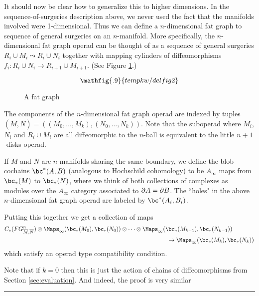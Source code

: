 It should now be clear how to generalize this to higher dimensions.
In the sequence-of-surgeries description above, we never used the fact that the manifolds
involved were 1-dimensional.
Thus we can define a $n$-dimensional fat graph to sequence of general surgeries
on an $n$-manifold.
More specifically,
the $n$-dimensional fat graph operad can be thought of as a sequence of general surgeries
$R_i \cup M_i \leadsto R_i \cup N_i$ together with mapping cylinders of diffeomorphisms
$f_i: R_i\cup N_i \to R_{i+1}\cup M_{i+1}$.
(See Figure \ref{delfig2}.)
\begin{figure}[!ht]
$$\mathfig{.9}{tempkw/delfig2}$$
\caption{A fat graph}\label{delfig2}\end{figure}
The components of the $n$-dimensional fat graph operad are indexed by tuples
$(\overline{M}, \overline{N}) = ((M_0,\ldots,M_k), (N_0,\ldots,N_k))$.
Note that the suboperad where $M_i$, $N_i$ and $R_i\cup M_i$ are all diffeomorphic to 
the $n$-ball is equivalent to the little $n{+}1$-disks operad.


If $M$ and $N$ are $n$-manifolds sharing the same boundary, we define
the blob cochains $\bc^*(A, B)$ (analogous to Hochschild cohomology) to be
$A_\infty$ maps from $\bc_*(M)$ to $\bc_*(N)$, where we think of both
collections of complexes as modules over the $A_\infty$ category associated to $\partial A = \partial B$.
The ``holes" in the above 
$n$-dimensional fat graph operad are labeled by $\bc^*(A_i, B_i)$.

Putting this together we get a collection of maps
\begin{eqnarray*}
	C_*(FG^n_{\overline{M}, \overline{N}})\otimes \mapinf(\bc_*(M_0), \bc_*(N_0))\otimes\cdots\otimes 
\mapinf(\bc_*(M_{k-1}), \bc_*(N_{k-1})) & \\
	& \hspace{-11em}\to  \mapinf(\bc_*(M_k), \bc_*(N_k))
\end{eqnarray*}
which satisfy an operad type compatibility condition.

Note that if $k=0$ then this is just the action of chains of diffeomorphisms from Section \ref{sec:evaluation}.
And indeed, the proof is very similar 



\medskip
\hrule\medskip


